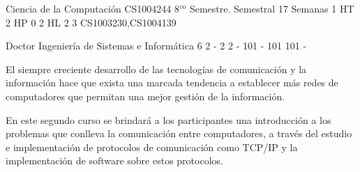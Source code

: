 \documentclass[a4paper,8pt]{article}
\begin{document}
\setNombreProfesor{}
\setGradoProfesorAbreviado{}
\sylabusHeader

\academicaTable
{Ciencia de la Computación} %
{CS1004244} %
{8$^{vo}$ Semestre.} %
{Semestral} %
{17 Semanas} %
{1 HT} %
{2 HP} %
{0} %
{2 HL}  %
{2} %
{3} %
{CS1003230,CS1004139} %

\administrativaTable
{Doctor} %
{Ingeniería de Sistemas e Informática} %
{6} %
{2} %
{-} %
{2} %
{2} %
{-} %
{101} %
{-} %
{101} %
{101} %
{-} %


\begin{fundamentacion}
El siempre creciente desarrollo de las tecnologías de comunicación y la
información hace que exista una marcada tendencia a  establecer
más redes de computadores que permitan una mejor
gestión de la información.

En este segundo curso se brindará a los participantes una introducción a los
problemas que conlleva la comunicación entre computadores, a través del
estudio e implementación de protocolos de comunicación como TCP/IP y
la implementación de software sobre estos protocolos.

\end{fundamentacion}

\begin{sumilla}
\item \NCIntroduction
\item \NCNetworkedApplications
\item \NCReliableDataDelivery
\item \NCRoutingandForwarding
\item \NCLocalAreaNetworks
\item \NCResourceAllocation
\item \NCMobility
\item \NCSocialNetworking

\end{sumilla}
\end{document}
